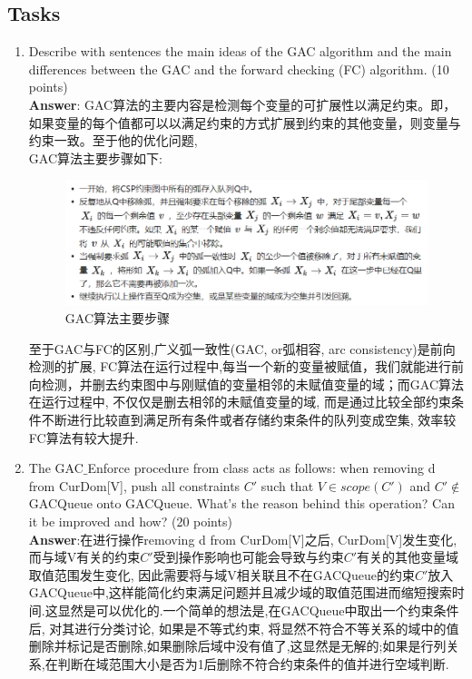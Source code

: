 \documentclass{article}
\begin{document}
\subsection{Tasks}

\begin{enumerate}
\item Describe with sentences the main ideas of the GAC algorithm and the main differences between the GAC and the forward checking (FC) algorithm. (10 points)\\
\textbf{Answer}: GAC算法的主要内容是检测每个变量的可扩展性以满足约束。即，如果变量的每个值都可以以满足约束的方式扩展到约束的其他变量，则变量与约束一致。至于他的优化问题, \\
GAC算法主要步骤如下:\\

\begin{figure}[!h]
    \centering
    \includegraphics[width=6in]{p1.bmp}   \caption{GAC算法主要步骤}
\end{figure}
\newpage
至于GAC与FC的区别,广义弧一致性(GAC, or弧相容, arc consistency)是前向检测的扩展, FC算法在运行过程中,每当一个新的变量被赋值，我们就能进行前向检测，并删去约束图中与刚赋值的变量相邻的未赋值变量的域；而GAC算法在运行过程中, 不仅仅是删去相邻的未赋值变量的域, 而是通过比较全部约束条件不断进行比较直到满足所有条件或者存储约束条件的队列变成空集, 效率较FC算法有较大提升.

\item The GAC$\_$Enforce procedure from class acts as follows: when removing d from CurDom[V], push all constraints $C'$ such that $V\in scope(C')$ and $C'\not\in$ GACQueue onto GACQueue. What's the reason behind this operation? Can it be improved and how? (20 points)\\
\textbf{Answer}:在进行操作removing d from CurDom[V]之后, CurDom[V]发生变化, 而与域V有关的约束$C'$受到操作影响也可能会导致与约束$C'$有关的其他变量域取值范围发生变化, 因此需要将与域V相关联且不在GACQueue的约束$C'$放入GACQueue中,这样能简化约束满足问题并且减少域的取值范围进而缩短搜索时间.这显然是可以优化的.\label{Node}一个简单的想法是,在GACQueue中取出一个约束条件后, 对其进行分类讨论, 如果是不等式约束, 将显然不符合不等关系的域中的值删除并标记是否删除,如果删除后域中没有值了,这显然是无解的;如果是行列关系,在判断在域范围大小是否为1后删除不符合约束条件的值并进行空域判断.


\end{enumerate}
\end{document}
